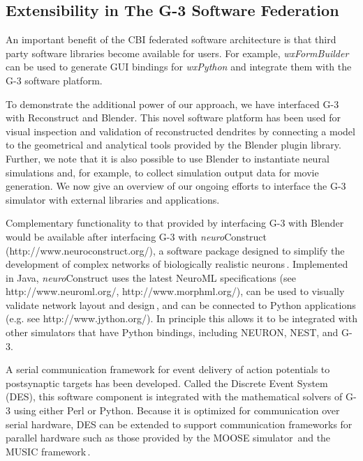\documentclass[12pt]{article}
\begin{document}
\subsection{Extensibility in The G-3 Software Federation}

An important benefit of the CBI federated software architecture is
that third party software libraries become available for users.  For
example, {\it wxFormBuilder} can be used to generate GUI bindings for
{\it wxPython} and integrate them with the G-3 software platform.

To demonstrate the additional power of our approach, we have
interfaced G-3 with Reconstruct and Blender. This novel software
platform has been used for visual inspection and validation of
reconstructed dendrites by connecting a model to the geometrical and
analytical tools provided by the Blender plugin library.  Further, we
note that it is also possible to use Blender to instantiate neural
simulations and, for example, to collect simulation output data for
movie generation.  We now give an overview of our ongoing efforts to
interface the G-3 simulator with external libraries and applications.

Complementary functionality to that provided by interfacing G-3 with
Blender would be available after interfacing G-3 with {\it
  neuro}Construct (http://www.neuroconstruct.org/), a software package
designed to simplify the development of complex networks of
biologically realistic neurons\,\cite{gleeson05:_build_networ_model,
  gleeson07}.  Implemented in Java, {\it neuro}Construct uses the
latest NeuroML specifications (see http://www.neuroml.org/,
http://www.morphml.org/), can be used to visually validate network
layout and design\,\cite{crook07:_morph}, and can be connected to
Python applications (e.g.  see http://www.jython.org/).  In principle
this allows it to be integrated with other simulators that have Python
bindings, including NEURON, NEST, and G-3.

A serial communication framework for event delivery of action
potentials to postsynaptic targets has been developed.  Called the
Discrete Event System (DES), this software component is integrated
with the mathematical solvers of G-3 using either Perl or Python.
Because it is optimized for communication over serial hardware, DES
can be extended to support communication frameworks for parallel
hardware such as those provided by the MOOSE
simulator\,\cite{ray08:_pymoos} and the MUSIC
framework\,\cite{ekeberg08:_music_multis_coord,
  djurfeldt10:_run_time_inter_between_neuron}.
\end{document}

